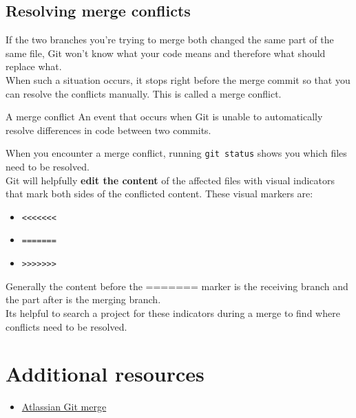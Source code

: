 \subsection{Resolving merge conflicts}

If the two branches you're trying to merge both changed the same part of the same file, Git won't know what your code means and therefore what should replace what. 
\\

When such a situation occurs, it stops right before the merge commit so that you can resolve the conflicts manually. This is called a merge conflict.
\\

\begin{infobox}{A merge conflict}
	An event that occurs when Git is unable to automatically resolve differences in code between two commits.
\end{infobox}

When you encounter a merge conflict, running \texttt{git status} shows you which files need to be resolved.
\\

Git will helpfully \textbf{edit the content} of the affected files with visual indicators that mark both sides of the conflicted content. These visual markers are: 

\begin{itemize}
    \item \texttt{<<<<<<<}
    \item \texttt{=======}
    \item \texttt{>>>>>>>}
\end{itemize}

Generally the content before the ======= marker is the receiving branch and the part after is the merging branch.
\\

Its helpful to search a project for these indicators during a merge to find where conflicts need to be resolved.
\\


\section{Additional resources}

\begin{itemize}[leftmargin=*]
    \item \href{https://www.atlassian.com/git/tutorials/using-branches/git-merge}{Atlassian Git merge}
\end{itemize}
